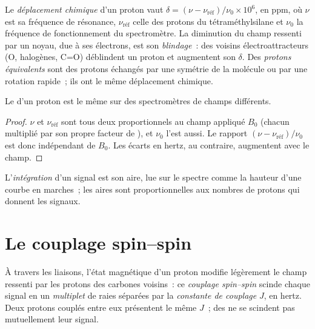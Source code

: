 \begin{definition}\label{def:b1:structure-spectroscopy:chemical-shift}
Le \emph{déplacement chimique} d'un proton vaut
$\delta = (\nu - \nu_{\text{réf}})/\nu_0 \times 10^6$, en \unit{ppm}, où
$\nu$ est sa fréquence de résonance, $\nu_{\text{réf}}$ celle des
protons du tétraméthylsilane et $\nu_0$ la fréquence de fonctionnement
du spectromètre. La diminution du champ ressenti par un noyau, due à ses
électrons, est son \emph{blindage}~: des voisins
électroattracteurs (O, halogènes, C=O) déblindent un proton et
augmentent son $\delta$. Des \emph{protons équivalents} sont des
protons échangés par une symétrie de la molécule ou par une rotation
rapide~; ils ont le même déplacement chimique.
\end{definition}

\begin{proposition}\label{prop:b1:structure-spectroscopy:shift-field-independent}
Le  d'un proton est le même sur des spectromètres de
champs différents.
\end{proposition}

\begin{proof}
$\nu$ et $\nu_{\text{réf}}$ sont tous deux proportionnels au champ
appliqué $B_0$ (chacun multiplié par son propre facteur de ), et
$\nu_0$ l'est aussi. Le rapport $(\nu - \nu_{\text{réf}})/\nu_0$ est donc
indépendant de $B_0$. Les écarts en hertz, au contraire, augmentent avec
le champ.
\end{proof}

\begin{definition}[Intégration]\label{def:b1:structure-spectroscopy:integration}
L'\emph{intégration} d'un signal est son aire, lue sur le
spectre comme la hauteur d'une courbe en marches~; les aires sont
proportionnelles aux nombres de protons qui donnent les signaux.
\end{definition}

\section{Le couplage spin--spin}

\begin{definition}\label{def:b1:structure-spectroscopy:coupling}
À travers les liaisons, l'état magnétique d'un proton modifie légèrement
le champ ressenti par les protons des carbones voisins~: ce
\emph{couplage spin--spin} scinde chaque
signal en un \emph{multiplet} de raies séparées par la
\emph{constante de couplage} $J$, en hertz.
Deux protons couplés entre eux présentent le même $J$~; des  ne se scindent pas mutuellement leur signal.
\end{definition}

